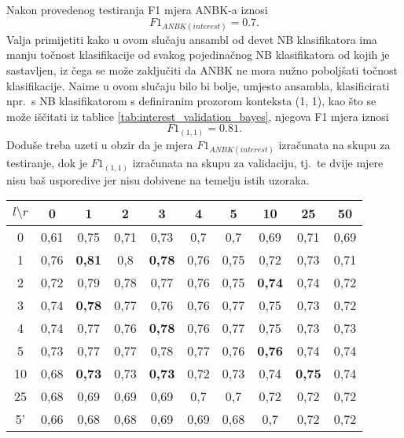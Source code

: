 \documentclass[10pt, a4paper]{article}
\begin{document}
Nakon provedenog testiranja F1 mjera ANBK-a iznosi
\begin{equation}
\label{eq:F1_ansambl}
F1_{ANBK(interest)} = 0.7.
\end{equation}
Valja primijetiti kako u ovom
slučaju ansambl od devet NB klasifikatora ima manju točnost klasifikacije
od svakog pojedinačnog NB klasifikatora od kojih je sastavljen,
iz čega se može zaključiti da ANBK ne mora nužno poboljšati
točnost klasifikacije. Naime u ovom slučaju bilo bi bolje, umjesto ansambla, klasificirati
npr.~s NB klasifikatorom s definiranim prozorom konteksta (1, 1), kao
što se može iščitati iz tablice \ref{tab:interest_validation_bayes}, njegova F1 mjera iznosi
\begin{equation}
\label{eq:F1_1_1}
F1_{(1,1)} = 0.81.
\end{equation}
Doduše treba uzeti u obzir da je mjera $F1_{ANBK(interest)}$ izračunata na skupu za testiranje,
dok je $F1_{(1,1)}$ izračunata na skupu za validaciju, tj.~te dvije mjere nisu
baš usporedive jer nisu dobivene na temelju istih uzoraka.

\begin{table*}[!hbtp]
\caption{Validacijom dobivene F1 mjere NB klasifikatora s prozorom konteksta $(l,r)$ za riječ \emph{interest}}
\label{tab:interest_validation_bayes}
\begin{center}
\begin{tabular}{|c||ccc|ccc|ccc|}
\hline
$l \setminus r$ & 0 & 1 & 2 & 3 & 4 & 5 & 10 & 25 & 50 \\
\hline\hline
0  & 0,61 & 0,75 & 0,71 & 0,73 & 0,7  & 0,7  & 0,69 & 0,71 & 0,69  \\
1  & 0,76 & \textbf{0,81} & 0,8  & \textbf{0,78} & 0,76 & 0,75 & 0,72 & 0,73 & 0,71  \\
2  & 0,72 & 0,79 & 0,78 & 0,77 & 0,76 & 0,75 & \textbf{0,74} & 0,74 & 0,72  \\\hline
3  & 0,74 & \textbf{0,78} & 0,77 & 0,76 & 0,76 & 0,77 & 0,75 & 0,73 & 0,72  \\
4  & 0,74 & 0,77 & 0,76 & \textbf{0,78} & 0,76 & 0,77 & 0,75 & 0,73 & 0,73  \\
5  & 0,73 & 0,77 & 0,77 & 0,78 & 0,77 & 0,76 & \textbf{0,76} & 0,74 & 0,74  \\\hline
10 & 0,68 & \textbf{0,73} & 0,73 & \textbf{0,73} & 0,72 & 0,73 & 0,74 & \textbf{0,75} & 0,74  \\
25 & 0,68 & 0,69 & 0,69 & 0,69 & 0,7  & 0,7  & 0,72 & 0,72 & 0,72  \\
5' & 0,66 & 0,68 & 0,68 & 0,69 & 0,69 & 0,68 & 0,7  & 0,72 & 0,72  \\
\hline
\end{tabular}
\end{center}
\end{table*}
\end{document}
